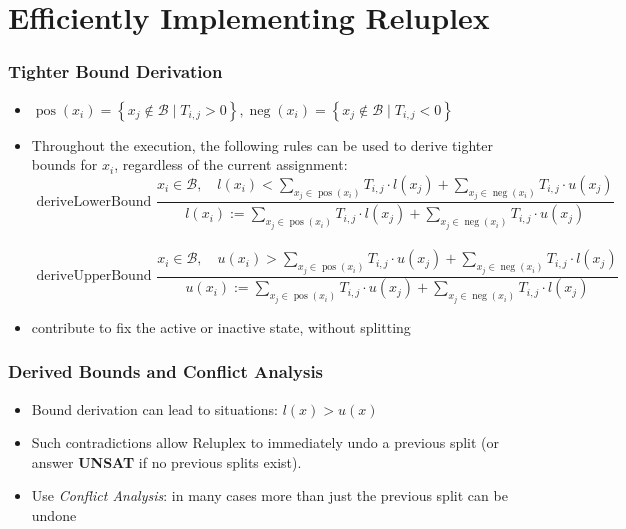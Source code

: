 \documentclass[aspectratio=169%
,serif,mathserif]{beamer}
\begin{document}
\section{ Efficiently Implementing Reluplex}

\begin{frame}
	\frametitle{Tighter Bound Derivation}
	\begin{itemize}
		\item $\operatorname{pos}\left(x_{i}\right)=\left\{x_{j} \notin \mathcal{B} \mid T_{i, j}>0\right\},\operatorname{neg}\left(x_{i}\right)=\left\{x_{j} \notin \mathcal{B} \mid T_{i, j}<0\right\}$
		\item Throughout the execution, the following rules can be used to derive tighter bounds for $x_i$, regardless of the current assignment:
			$$\text { deriveLowerBound } \frac{x_{i} \in \mathcal{B}, \quad l\left(x_{i}\right)<\sum_{x_{j} \in \operatorname{pos}\left(x_{i}\right)} T_{i, j} \cdot l\left(x_{j}\right)+\sum_{x_{j} \in \operatorname{neg}\left(x_{i}\right)} T_{i, j} \cdot u\left(x_{j}\right)}{l\left(x_{i}\right):=\sum_{x_{j} \in \operatorname{pos}\left(x_{i}\right)} T_{i, j} \cdot l\left(x_{j}\right)+\sum_{x_{j} \in \operatorname{neg}\left(x_{i}\right)} T_{i, j} \cdot u\left(x_{j}\right)}$$\\
			$$\text { deriveUpperBound } \frac{x_{i} \in \mathcal{B}, \quad u\left(x_{i}\right)>\sum_{x_{j} \in \operatorname{pos}\left(x_{i}\right)} T_{i, j} \cdot u\left(x_{j}\right)+\sum_{x_{j} \in \operatorname{neg}\left(x_{i}\right)} T_{i, j} \cdot l\left(x_{j}\right)}{u\left(x_{i}\right):=\sum_{x_{j} \in \operatorname{pos}\left(x_{i}\right)} T_{i, j} \cdot u\left(x_{j}\right)+\sum_{x_{j} \in \operatorname{neg}\left(x_{i}\right)} T_{i, j} \cdot l\left(x_{j}\right)}$$
		\item contribute to fix the active or inactive state, without splitting
	\end{itemize}
\end{frame}

\begin{frame}
	\frametitle{Derived Bounds and Conflict Analysis}
	\begin{itemize}
		\item Bound derivation can lead to situations: $l(x) > u(x)$
		\item Such contradictions allow Reluplex to immediately undo a previous split (or answer \textbf{UNSAT} if no previous splits exist). 
		\item Use \emph{Conflict Analysis}: in many cases more than just the previous split can be undone
	\end{itemize}
\end{frame}
\end{document}
